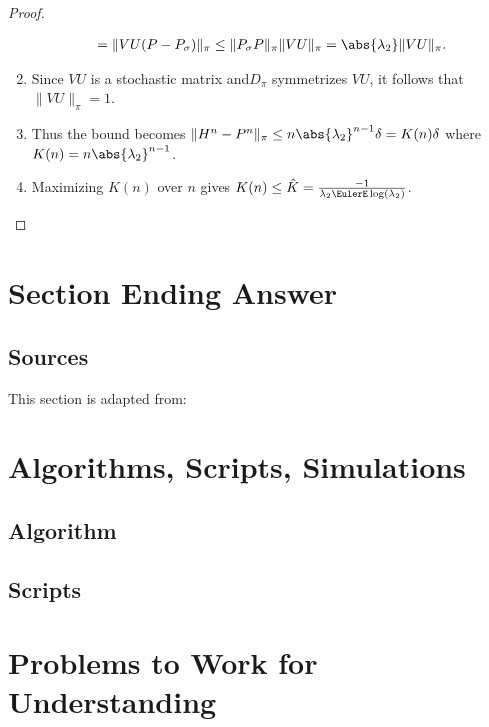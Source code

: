 \documentclass[12pt]{article}
\begin{document}
\begin{proof}
\begin{enumerate}
\begin{multline*}
    = \| VU(P - P_{\sigma})\|_{\pi} \le \|P_{\sigma} P\|_{\pi}
    \|VU\|_{\pi} = \abs{\lambda_2} \|VU\|_{\pi}.
  \end{multline*}
\item Since $VU$ is a stochastic matrix and$D_{\pi}$ symmetrizes $VU$,
  it follows that $\| VU \|_{\pi} = 1$.
\item Thus the bound becomes $\| H^n - P^n\|_{\pi} \le n
  \abs{\lambda_2}^{n-1} \delta = K(n) \delta$ where $K(n) = n \abs{\lambda_2}^{n-1}$.
\item Maximizing $K(n)$ over $n$ gives $K(n) \le \hat{K} =
  \frac{-1}{\lambda_2 \EulerE \log(\lambda_2)}$.
  \end{enumerate}
\end{proof}

\section*{Section Ending Answer}

\subsection*{Sources}
This section is adapted from: 

\nocite{}
\nocite{}

\hr

\section*{Algorithms, Scripts, Simulations}

\subsection*{Algorithm}

\subsection*{Scripts}



\hr

\section*{Problems to Work for Understanding}
\renewcommand{\theexerciseseries}{}
\renewcommand{\theexercise}{\arabic{exercise}}
\end{document}
